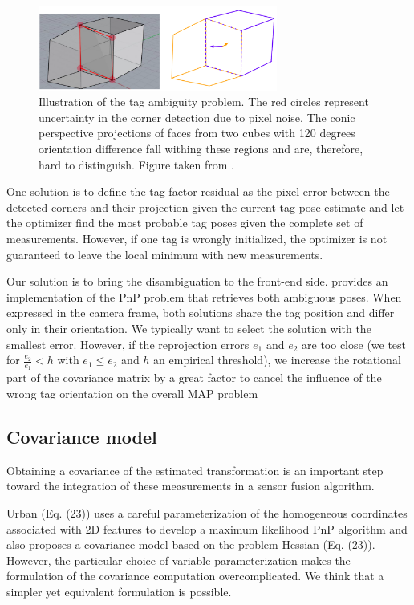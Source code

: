 \begin{figure}
    \centering
    \includegraphics[width=0.7\textwidth]{figures/tag_ambiguity.png}
    \caption{Illustration of the tag ambiguity problem. The red circles represent uncertainty in the corner detection due to pixel noise. 
    The conic perspective projections of faces from two cubes with 120 degrees orientation difference fall withing these regions and are, therefore, 
    hard to distinguish. Figure taken from \cite{8206468}.}
    \label{fig:tag_ambiguity}
\end{figure}

One solution is to define the tag factor residual as the pixel error between the detected corners and their projection given the
current tag pose estimate and let the optimizer find the most probable tag poses given the complete set of measurements. However, if one tag is wrongly initialized, 
the optimizer is not guaranteed to leave the local minimum with new measurements. 

Our solution is to bring the disambiguation to the front-end side.
\cite{collins2014infinitesimal} provides an implementation of the PnP problem that retrieves both ambiguous poses. When expressed in the camera frame, 
both solutions share the tag position and differ only in their orientation. We typically want to select the solution with the smallest error. 
However, if the reprojection errors $e_1$ and $e_2$ are too close (we test for $\tfrac{e_2}{e_1} < h$ with $e_1 \leq e_2$ and $h$ an empirical threshold), 
we increase the rotational part of the covariance matrix by a great factor to cancel the influence of the wrong tag orientation on the 
overall MAP problem

\subsection{Covariance model}
\label{sec:apritlag_covariance}
Obtaining a covariance of the estimated transformation is an important step toward the integration of these measurements in a sensor fusion algorithm.

Urban \cite{urban2016mlpnp} (Eq. (23)) uses a careful parameterization of the homogeneous coordinates associated with 2D features to develop
a maximum likelihood PnP algorithm and also proposes a covariance model based on the problem Hessian (Eq. (23)).  However, the particular choice of variable 
parameterization makes the formulation of the covariance computation overcomplicated.
We think that a simpler yet equivalent formulation is possible. 

